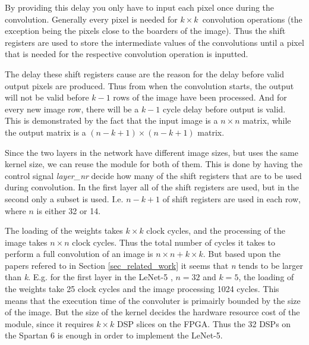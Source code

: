 By providing this delay you only have to input each pixel once during the convolution. Generally every pixel is needed for $ k \times k $ convolution operations (the exception being the pixels close to the boarders of the image). Thus the shift registers are used to store the intermediate values of the convolutions until a pixel that is needed for the respective convolution operation is inputted. 

The delay these shift registers cause are the reason for the delay before valid output pixels are produced. Thus from when the convolution starts, the output will not be valid before $ k-1 $ rows of the image have been processed. And for every new image row, there will be a $ k-1 $ cycle delay before output is valid. This is demonstrated by the fact that the input image is a $ n \times n $ matrix, while the output matrix is a $ (n-k+1) \times (n-k+1) $ matrix. 

Since the two layers in the network have different image sizes, but uses the same kernel size, we can reuse the module for both of them. This is done by having the control signal \textit{layer\_nr} decide how many of the shift registers that are to be used during convolution. In the first layer all of the shift registers are used, but in the second only a subset is used. I.e. $ n-k+1 $ of shift registers are used in each row, where $ n $ is either 32 or 14. 

The loading of the weights takes $ k \times k $ clock cycles, and the processing of the image takes $ n \times n $ clock cycles. Thus the total number of cycles it takes to perform a full convolution of an image is $ n \times n + k \times k $. But based upon the papers refered to in Section \ref{sec_related_work} it seems that \textit{n} tends to be larger than \textit{k}. E.g. for the first layer in the LeNet-5 \cite{LeCun1998}, $ n = 32 $ and $ k = 5 $, the loading  of the weights take 25 clock cycles and the image processing 1024 cycles. This means that the execution time of the convoluter is primairly bounded by the size of the image. But the size of the kernel decides the hardware resource cost of the module, since it requires $ k \times k $ DSP slices on the FPGA. Thus the 32 DSPs on the Spartan 6 is enough in order to implement the LeNet-5. 

